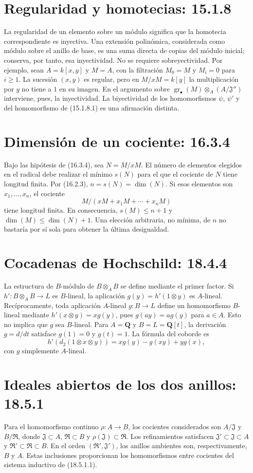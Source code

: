 \documentclass[11pt,a4paper]{article}
\newcommand{\gr}{\operatorname{gr}}
\begin{document}
\section*{Regularidad y homotecias: 15.1.8}
La regularidad de un elemento sobre un módulo significa que la homotecia
correspondiente es inyectiva. Una extensión polinómica, considerada como módulo
sobre el anillo de base, es una suma directa de copias del módulo inicial;
conserva, por tanto, esa inyectividad. No se requiere sobreyectividad.
Por ejemplo, sean $A=k[x,y]$ y $M=A$, con la filtración $M_0=M$ y
$M_i=0$ para $i\geq1$. La sucesión $(x,y)$ es regular, pero en
$M/xM=k[y]$ la multiplicación por $y$ no tiene a $1$ en su imagen.
En el argumento sobre $\gr_\bullet(M)\otimes_A(A/\mathfrak J'')$
interviene, pues, la inyectividad. La biyectividad de los homomorfismos
$\psi$, $\psi'$ y del homomorfismo de (15.1.8.1) es una afirmación distinta.

\section*{Dimensión de un cociente: 16.3.4}
Bajo las hipótesis de (16.3.4), sea $N=M/xM$. El número de elementos
elegidos en el radical debe realizar el mínimo $s(N)$ para el que el cociente
de $N$ tiene longitud finita. Por (16.2.3),
$n=s(N)=\dim(N)$. Si esos elementos son $x_1,\ldots,x_n$, el cociente
\[
M/(xM+x_1M+\cdots+x_nM)
\]
tiene longitud finita. En consecuencia, $s(M)\leq n+1$ y
$\dim(M)\leq\dim(N)+1$. Una elección arbitraria, no mínima, de $n$
no bastaría por sí sola para obtener la última desigualdad.

\section*{Cocadenas de Hochschild: 18.4.4}
La estructura de $B$-módulo de $B\otimes_A B$ se define mediante el primer
factor. Si $h':B\otimes_A B\to L$ es $B$-lineal, la aplicación
$g(y)=h'(1\otimes y)$ es $A$-lineal. Recíprocamente, toda aplicación
$A$-lineal $g:B\to L$ define un homomorfismo $B$-lineal mediante
$h'(x\otimes y)=xg(y)$, pues $g(ay)=ag(y)$ para $a\in A$.
Esto no implica que $g$ sea $B$-lineal. Para $A=\mathbf Q$ y
$B=L=\mathbf Q[t]$, la derivación $g=d/dt$ satisface $g(1)=0$ y $g(t)=1$.
La fórmula del coborde es
\[
h'(d_2(1\otimes x\otimes y))=xg(y)-g(xy)+yg(x),
\]
con $g$ simplemente $A$-lineal.

\section*{Ideales abiertos de los dos anillos: 18.5.1}
Para el homomorfismo continuo $\rho:A\to B$, los cocientes considerados
son $A/\mathfrak J$ y $B/\mathfrak R$, donde
$\mathfrak J\subset A$, $\mathfrak R\subset B$ y
$\rho(\mathfrak J)\subset\mathfrak R$. Los refinamientos satisfacen
$\mathfrak J'\subset\mathfrak J\subset A$ y
$\mathfrak R'\subset\mathfrak R\subset B$.
En el orden $(\mathfrak R',\mathfrak J')$, los anillos ambientes son,
respectivamente, $B$ y $A$. Estas inclusiones proporcionan los homomorfismos
entre cocientes del sistema inductivo de (18.5.1.1).
\end{document}
